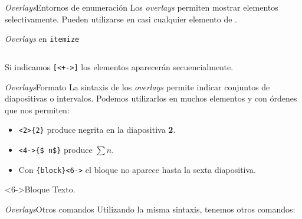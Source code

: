 \begin{frame}[fragile]{\textit{Overlays}}{Entornos de enumeración}
  Los \textit{overlays} permiten mostrar elementos selectivamente.
  Pueden utilizarse en casi cualquier elemento de \beamer.

  \espacio

  \begin{exampleblock}{\textit{Overlays} en \texttt{itemize}}

  \begin{columns}
  \end{columns}
  \espacio
  Si indicamos \texttt{[<+->]} los elementos aparecerán secuencialmente.
  \end{exampleblock}
\end{frame}

\begin{frame}{\textit{Overlays}}{Formato}
  La sintaxis de los \textit{overlays} permite indicar conjuntos de diapositivas
  o intervalos. Podemos utilizarlos en muchos elementos y con órdenes que nos permiten:
    \espacio

    \begin{itemize}
      \item {}\texttt{\alert<1>{<2>}\{2\}} produce negrita en la
      diapositiva \textbf<2>{2}.

      \item {}\texttt{\alert<3>{<4->}\{\$ n\$\}}
      produce \alert<4->{$\sum n$}.

      \item Con \texttt{\{block\}\alert<5>{<6->}} el
      bloque no aparece hasta la sexta diapositiva.
    \end{itemize}

    \begin{block}<6->{Bloque}
      Texto.
    \end{block}
\end{frame}

\begin{frame}[fragile]{\textit{Overlays}}{Otros comandos}
  Utilizando la misma sintaxis, tenemos otros comandos:
  \espacio
\end{frame}

